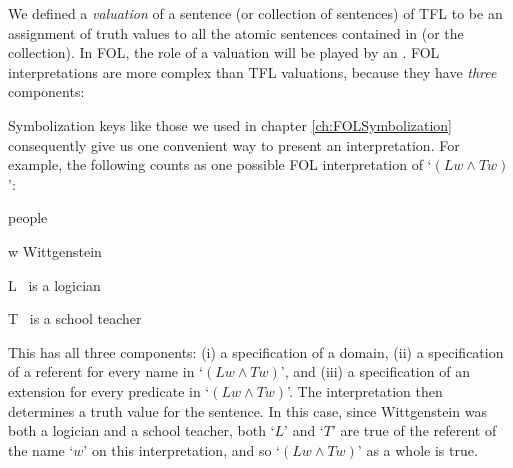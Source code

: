 We defined a \emph{valuation} of a sentence \meta{\varphi} (or collection of sentences) of TFL to be an assignment of truth values to all the atomic sentences contained in \meta{\varphi} (or the collection). In FOL, the role of a valuation will be played by an .  FOL interpretations are more complex than TFL valuations, because they have  \emph{three} components:

Symbolization keys like those we used in chapter \ref{ch:FOLSymbolization} consequently give us one convenient way to present an interpretation.  For example, the following counts as one possible FOL interpretation of `$(Lw \land Tw)$':
	\begin{ekey}
		\item[\text{Domain}] people
		\item[w] Wittgenstein
		\item[L] \blank\ is a logician
		\item[T]\blank\ is a school teacher
	\end{ekey}
This has all three components: (i) a specification of a domain, (ii) a specification of a referent for every name in `$(Lw \land Tw)$', and (iii) a specification of an extension for every predicate in `$(Lw \land Tw)$'.  The interpretation then determines a truth value for the sentence.  In this case, since Wittgenstein was both a logician and a school teacher, both `$L$' and `$T$' are true of the referent of the name `$w$' on this interpretation, and so `$(Lw \land Tw)$' as a whole is true.

